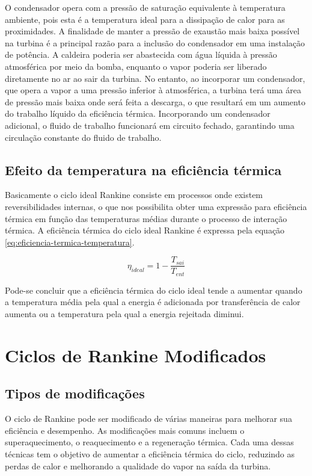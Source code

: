 \documentclass[
	article,			%
	11pt,				%
	oneside,			%
	a4paper,			%
	english,			%
	brazil,				%
	sumario=tradicional
	]{abntex2}
\begin{document}
O condensador opera com a pressão de saturação equivalente à temperatura ambiente, pois esta é a temperatura ideal para a dissipação de calor para as proximidades. A finalidade de manter a pressão de exaustão mais baixa possível na turbina é a principal razão para a inclusão do condensador em uma instalação de potência. A caldeira poderia ser abastecida com água líquida à pressão atmosférica por meio da bomba, enquanto o vapor poderia ser liberado diretamente no ar ao sair da turbina. No entanto, ao incorporar um condensador, que opera a vapor a uma pressão inferior à atmosférica, a turbina terá uma área de pressão mais baixa onde será feita a descarga, o que resultará em um aumento do trabalho líquido da eficiência térmica. Incorporando um condensador adicional, o fluido de trabalho funcionará em circuito fechado, garantindo uma circulação constante do fluido de trabalho.

\subsection{Efeito da temperatura na eficiência térmica}

Basicamente o ciclo ideal Rankine consiste em processos onde existem reversibilidades internas, o que nos possibilita obter uma expressão para eficiência térmica em função das temperaturas médias durante o processo de interação térmica. A eficiência térmica do ciclo ideal Rankine é expressa pela equação \ref{eq:eficiencia-termica-temperatura}.

\begin{equation}
	\eta_{ideal} = 1 - \frac{T_{sai}}{T_{ent}}
	\label{eq:eficiencia-termica-temperatura}
\end{equation}

Pode-se concluir que a eficiência térmica do ciclo ideal tende a aumentar quando a temperatura média pela qual a energia é adicionada por transferência de calor aumenta ou a temperatura pela qual a energia rejeitada diminui.

\section{Ciclos de Rankine Modificados}

\subsection{Tipos de modificações}

O ciclo de Rankine pode ser modificado de várias maneiras para melhorar sua eficiência e desempenho. As modificações mais comuns incluem o superaquecimento, o reaquecimento e a regeneração térmica. Cada uma dessas técnicas tem o objetivo de aumentar a eficiência térmica do ciclo, reduzindo as perdas de calor e melhorando a qualidade do vapor na saída da turbina.
\end{document}
